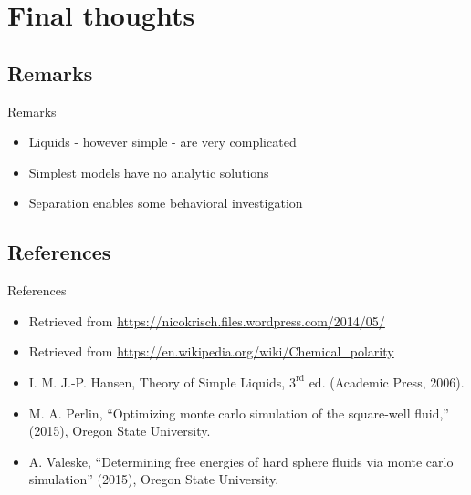 \documentclass{beamer}
\begin{document}
\section*{Final thoughts}
\subsection*{Remarks}
\begin{frame}{Remarks}
	\begin{itemize}
		\item Liquids - however simple - are very complicated
		\item Simplest models have no analytic solutions
		\item Separation enables some behavioral investigation
	\end{itemize}
\end{frame}
\subsection*{References}
\begin{frame}{References}
	\tiny
	\begin{itemize}
		\item Retrieved from \url{https://nicokrisch.files.wordpress.com/2014/05/}
		\item Retrieved from \url{https://en.wikipedia.org/wiki/Chemical_polarity}
		\item I. M. J.-P. Hansen, Theory of Simple Liquids, $3^{\text{rd}}$ ed. (Academic Press, 2006).
		\item M. A. Perlin, ``Optimizing monte carlo simulation of the square-well fluid,'' (2015), Oregon State University.
		\item A. Valeske, ``Determining free energies of hard sphere fluids via monte carlo simulation'' (2015), Oregon State University.
	\end{itemize}
\end{frame}
\end{document}
